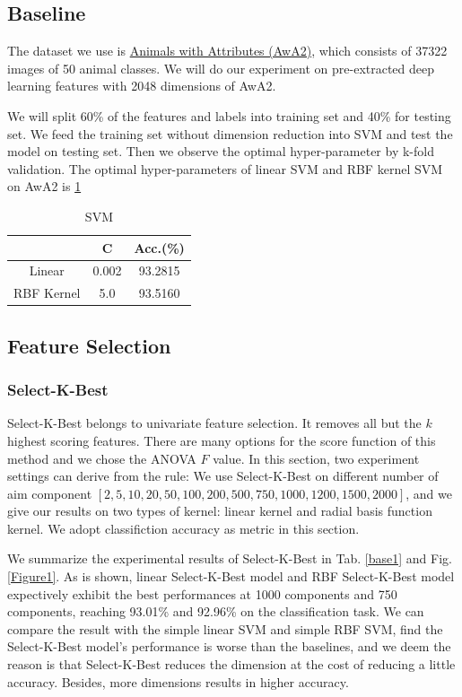 \documentclass{article}
\begin{document}
\subsection{Baseline}
\par The dataset we use is \href{https://cvml.ist.ac.at/AwA2/}{Animals with Attributes (AwA2)}, which consists of 37322 images of 50 animal classes. We will do our experiment on pre-extracted deep learning features with 2048 dimensions of AwA2.
\par We will split 60\% of the features and labels into training set and 40\% for testing set.
We feed the training set without dimension reduction into SVM and test the model on testing set. Then we observe the optimal hyper-parameter by k-fold validation. The optimal hyper-parameters of linear SVM and RBF kernel SVM on AwA2 is \ref{baseline}
\begin{table}[htbp]
	\centering
	\newcommand{\tabincell}[2]{\begin{tabular}{@{}#1@{}}#2\end{tabular}}
	\renewcommand\arraystretch{1.0}
	\caption{SVM}
	\label{baseline}%
	\begin{tabular}{c|c|c}
		\hline
			& C & Acc.(\%)\\
		\hline
		Linear & 0.002 & 93.2815\\
		\hline
		RBF Kernel & 5.0 & 93.5160\\
		\hline
\end{tabular}
\end{table}
\subsection{Feature Selection}
\subsubsection{Select-K-Best}
Select-K-Best belongs to univariate feature selection. It removes all but the $k$ highest scoring features. There are many options for the score function of this method and we chose the ANOVA $F$ value. In this section, two experiment settings can derive from the rule: We use Select-K-Best on different number of aim component $[2, 5, 10, 20, 50, 100, 200, 500, 750, 1000, 1200, 1500, 2000]$, and we give our results on two types of kernel: linear kernel and radial basis function kernel. We adopt classifiction accuracy as metric in this section.

We summarize the experimental results of Select-K-Best in Tab. \ref{base1} and Fig. \ref{Figure1}. As is shown, linear Select-K-Best model and RBF Select-K-Best model expectively exhibit the best performances at 1000 components and 750 components, reaching 93.01\% and 92.96\% on the classification task. We can compare the result with the simple linear SVM and simple RBF SVM, find the Select-K-Best model's performance is worse than the baselines, and we deem the reason is that Select-K-Best reduces the dimension at the cost of reducing a little accuracy. Besides, more dimensions results in higher accuracy.
\end{document}

